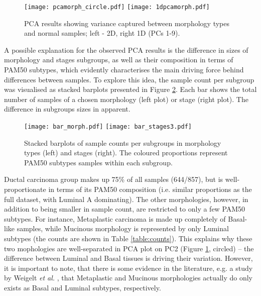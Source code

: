             \begin{figure}[!h]
            \hspace*{\fill}
            \texttt{[image: pcamorph\_circle.pdf]}\hfill
            \texttt{[image: 1dpcamorph.pdf]}
            \hspace*{\fill}
            \caption[PCA plots (2D and 1D) showing separation by tumour morphologies]{PCA results showing variance captured between morphology types and normal samples; left - 2D, right 1D (PCs 1-9). }
            \label{fig:1dpcamorph}
            \end{figure}

    
    \newpage
    A possible explanation for the observed PCA results is the difference in sizes of morphology and stages subgroups, as well as their composition in terms of PAM50 subtypes, which evidently characterises the main driving force behind differences between samples. To explore this idea, the sample count per subgroup was visualised as stacked barplots presented in Figure \ref{fig:barms}. Each bar shows the total number of samples of a chosen morphology (left plot) or stage (right plot). The difference in subgroups sizes in apparent.
       
        \begin{figure}[!h]
        \centering
        \texttt{[image: bar\_morph.pdf]}\hfill
        \texttt{[image: bar\_stages3.pdf]}
        \caption[Stacked barplots of samples count per stage and morphology type]{Stacked barplots of sample counts per subgroups in morphology types (left) and stages (right). The coloured proportions represent PAM50 subtypes samples within each subgroup.}
        \label{fig:barms}
        \end{figure}
        
    Ductal carcinoma group makes up 75\% of all samples (644/857), but is well-proportionate in terms of its PAM50 composition (i.e. similar proportions as the full dataset, with Luminal A dominating). The other morphologies, however, in addition to being smaller in sample count, are restricted to only a few PAM50 subtypes. For instance, Metaplastic carcinoma is made up completely of Basal-like samples, while Mucinous morphology is represented by only Luminal subtypes (the counts are shown in Table \ref{table:counts}). This explains why these two mophologies are well-separated in PCA plot on PC2 (Figure \ref{fig:1dpcamorph}, circled) -- the difference between Luminal and Basal tissues is driving their variation. However, it is important to note, that there is some evidence in the literature, e.g. a study by Weigelt \textit{et al.} \cite{Weigelt2010a}, that Metaplastic and Mucinous morphologies actually do only exists as Basal and Luminal subtypes, respectively.  
    
